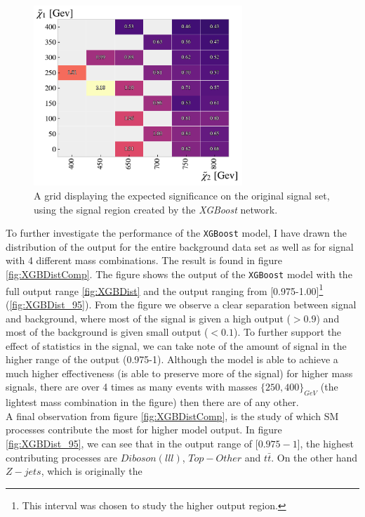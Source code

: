 \begin{figure}
    \centering
    \includegraphics[width=0.7\textwidth]{Figures/MLResults/XGB/SUSY/Grid/XGBGridSig.pdf}
    \caption{A grid displaying the expected significance on the original signal set, using the signal region 
    created by the \emph{XGBoost} network.}
    \label{fig:XGBoost}
\end{figure}
To further investigate the performance of the \verb!XGBoost! model, I have drawn the distribution of the output for the 
entire background data set as well as for signal with 4 different mass combinations. The result is found in figure 
\ref{fig:XGBDistComp}. The figure shows the output of the \verb!XGBoost! model with the full output range \ref{fig:XGBDist}
and the output ranging from [0.975-1.00]\footnote{This interval was chosen to study the higher output region.} (\ref{fig:XGBDist_95}). 
From the figure we observe a clear separation between 
signal and background, where most of the signal is given a high output ($>0.9$) and most of the background is given small
output ($<0.1$). To further support the effect of statistics in the signal, we can take note of the 
amount of signal in the higher range of the output (0.975-1). Although the model is able to achieve a much higher 
effectiveness (is able to preserve more of the signal) for higher mass signals, there are over 4 times as many 
events with masses $\{250,400\}_{GeV}$ (the lightest mass combination in the figure) then there are of any other.
\\
A final observation from figure \ref{fig:XGBDistComp}, is the study of which \ac{SM} processes contribute the most 
for higher model output. In figure \ref{fig:XGBDist_95}, we can see that in the output range of [$0.975-1$], the highest 
contributing processes are $Diboson(lll)$, $Top-Other$ and $t\bar{t}$. On the other hand $Z-jets$, which is originally the 
